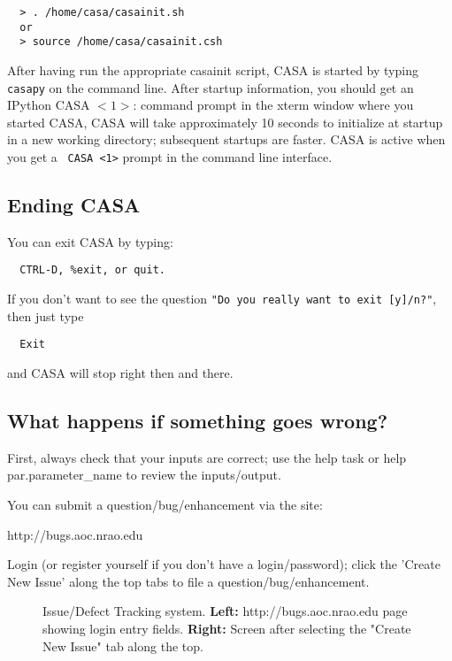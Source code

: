 \small
\begin{verbatim}
  > . /home/casa/casainit.sh
  or
  > source /home/casa/casainit.csh
\end{verbatim}
\normalsize

After having run the appropriate casainit script, CASA is started by
typing {\tt casapy} on the command line.  After startup information,
you should get an IPython {\rm CASA $<1>$:} command prompt in the
xterm window where you started CASA, CASA will take approximately 10
seconds to initialize at startup in a new working directory;
subsequent startups are faster.  CASA is active when you get a {\tt
CASA <1>} prompt in the command line interface.

\subsection{Ending CASA}
\label{subsection:ending}

You can exit CASA by typing:
\small
\begin{verbatim}
  CTRL-D, %exit, or quit.
\end{verbatim}
\normalsize
If you don't want to see the question {\tt "Do you really want to exit
[y]/n?"}, then just type 
\small
\begin{verbatim}
  Exit 
\end{verbatim}
\normalsize
and CASA will stop right then and there.


\subsection{What happens if something goes wrong?}
\label{subsection:wrong}

First, always check that your inputs are correct; use the help task or
help par.parameter\_name to review the inputs/output.

You can submit a question/bug/enhancement via the site:

http://bugs.aoc.nrao.edu

Login (or register yourself if you don't have a login/password); click
the 'Create New Issue' along the top tabs to file a
question/bug/enhancement.

\begin{figure}[h!]
\caption{\label{fig:jira} Issue/Defect Tracking system. {\bf Left:}
  http://bugs.aoc.nrao.edu page showing login entry fields. {\bf
  Right:} Screen after selecting the "Create New
  Issue" tab along the top.}
\hrulefill
\end{figure}

